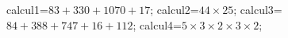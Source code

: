 \documentclass[exercice]{thedocument}%
\begin{document}
%
    \>calcul1=$83+330+1070+17$;%
    \>calcul2=$44\times25$;%
    \>calcul3=$84+388+747+16+112$;%
    \>calcul4=$5\times3\times2\times3\times2$;%
\end{document}
